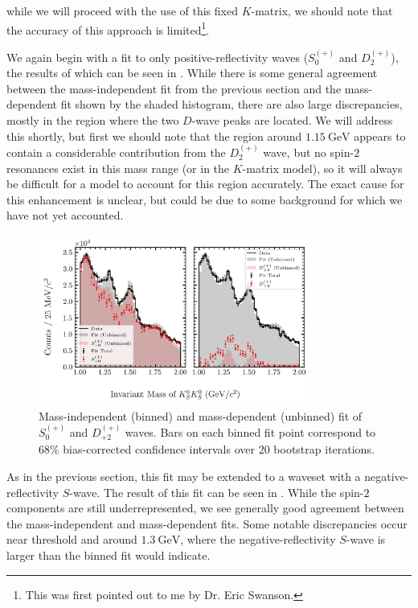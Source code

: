 while we will proceed with the use of this fixed $K$-matrix, we should note that the accuracy of this approach is limited\footnote{This was first pointed out to me by Dr. Eric Swanson.}.

We again begin with a fit to only positive-reflectivity waves ($S_0^{(+)}$ and $D_2^{(+)}$), the results of which can be seen in . While there is some general agreement between the mass-independent fit from the previous section and the mass-dependent fit shown by the shaded histogram, there are also large discrepancies, mostly in the region where the two $D$-wave peaks are located. We will address this shortly, but first we should note that the region around $\SI{1.15}{\giga\electronvolt}$ appears to contain a considerable contribution from the $D_2^{(+)}$ wave, but no spin-$2$ resonances exist in this mass range (or in the $K$-matrix model), so it will always be difficult for a model to account for this region accurately. The exact cause for this enhancement is unclear, but could be due to some background for which we have not yet accounted.

\begin{figure}
  \begin{center}
    \includegraphics[width=0.8\textwidth]{figures/binned_and_unbinned_fit_chisqdof_3.4_splot_D_1s_2b_phase_factor_waves491_uncertainty_bootstrap-SE.png}
  \end{center}
  \caption{Mass-independent (binned) and mass-dependent (unbinned) fit of $S_{0}^{(+)}$ and $D_{+2}^{(+)}$ waves. Bars on each binned fit point correspond to $68\%$ bias-corrected confidence intervals over $20$ bootstrap iterations.}\label{fig:unbinned-fit-chisqdof-3.4-Sp-D2p}
\end{figure}

As in the previous section, this fit may be extended to a waveset with a negative-reflectivity $S$-wave. The result of this fit can be seen in . While the spin-$2$ components are still underrepresented, we see generally good agreement between the mass-independent and mass-dependent fits. Some notable discrepancies occur near threshold and around $\SI{1.3}{\giga\electronvolt}$, where the negative-reflectivity $S$-wave is larger than the binned fit would indicate.

